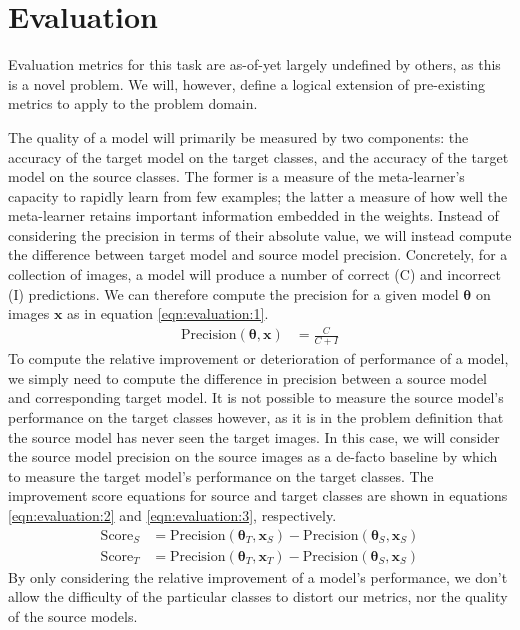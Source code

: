 \documentclass{report}
\begin{document}
	\section{Evaluation}
	Evaluation metrics for this task are as-of-yet largely undefined by others, as this is a novel problem. We will, however, define a logical extension of pre-existing metrics to apply to the problem domain. \par
	The quality of a model will primarily be measured by two components: the accuracy of the target model on the target classes, and the accuracy of the target model on the source classes. The former is a measure of the meta-learner's capacity to rapidly learn from few examples; the latter a measure of how well the meta-learner retains important information embedded in the weights. Instead of considering the precision in terms of their absolute value, we will instead compute the difference between target model and source model precision. Concretely, for a collection of images, a model will produce a number of correct (C) and incorrect (I) predictions. We can therefore compute the precision for a given model $\bm{\theta}$ on images $\bm{x}$ as in equation \ref{eqn:evaluation:1}.
	\begin{align} \label{eqn:evaluation:1}
	\text{Precision}(\bm{\theta}, \bm{x}) &= \frac{C}{C+I}
	\end{align}
	To compute the relative improvement or deterioration of performance of a model, we simply need to compute the difference in precision between a source model and corresponding target model. It is not possible to measure the source model's performance on the target classes however, as it is in the problem definition that the source model has never seen the target images. In this case, we will consider the source model precision on the source images as a de-facto baseline by which to measure the target model's performance on the target classes. The improvement score equations for source and target classes are shown in equations \ref{eqn:evaluation:2} and \ref{eqn:evaluation:3}, respectively.
	\begin{align} \label{eqn:evaluation:2}
	\text{Score}_S &= \text{Precision}(\bm{\theta}_T, \bm{x}_S) - \text{Precision}(\bm{\theta}_S, \bm{x}_S) \\
	\label{eqn:evaluation:3}
	\text{Score}_T &= \text{Precision}(\bm{\theta}_T, \bm{x}_T) - \text{Precision}(\bm{\theta}_S, \bm{x}_S)
	\end{align}
	By only considering the relative improvement of a model's performance, we don't allow the difficulty of the particular classes to distort our metrics, nor the quality of the source models.
	
\end{document}

